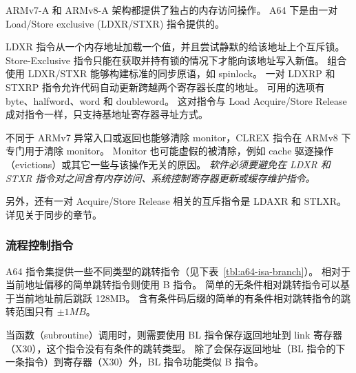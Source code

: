 ARMv7-A 和 ARMv8-A 架构都提供了独占的内存访问操作。
A64 下是由一对 Load/Store exclusive (LDXR/STXR) 指令提供的。

LDXR 指令从一个内存地址加载一个值，并且尝试静默的给该地址上个互斥锁。
Store-Exclusive 指令只能在获取并持有锁的情况下才能向该地址写入新值。
组合使用 LDXR/STXR 能够构建标准的同步原语，如 spinlock。
一对 LDXRP 和 STXRP 指令允许代码自动更新跨越两个寄存器长度的地址。
可用的选项有 byte、halfword、word 和 doubleword。
这对指令与 Load Acquire/Store Release 成对指令一样，只支持基地址寄存器寻址方式。

不同于 ARMv7 异常入口或返回也能够清除 monitor，CLREX 指令在 ARMv8 下专门用于清除 monitor。
Monitor 也可能虚假的被清除，例如 cache 驱逐操作（evictions）或其它一些与该操作无关的原因。
\textit{软件必须要避免在 LDXR 和 STXR 指令对之间含有内存访问、系统控制寄存器更新或缓存维护指令。}

另外，还有一对 Acquire/Store Release 相关的互斥指令是 LDAXR 和 STLXR。
详见关于同步的章节。

\subsubsection{流程控制指令}

A64 指令集提供一些不同类型的跳转指令（见下表~\ref{tbl:a64-isa-branch}）。
相对于当前地址偏移的简单跳转指令则使用 B 指令。
简单的无条件相对跳转指令可以基于当前地址前后跳跃 128MB。
含有条件码后缀的简单的有条件相对跳转指令的跳转范围只有 $\pm1MB$。

当函数（subroutine）调用时，则需要使用 BL 指令保存返回地址到 link 寄存器（X30），这个指令没有有条件的跳转类型。
除了会保存返回地址（BL 指令的下一条指令）到寄存器（X30）外，BL 指令功能类似 B 指令。


